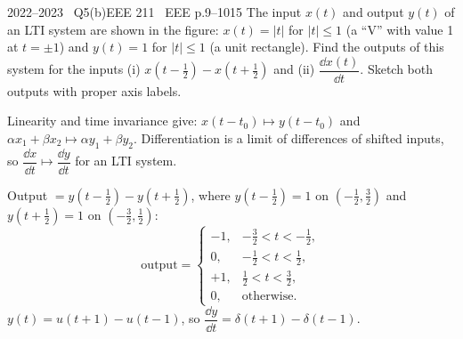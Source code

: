 \begin{qcard}{2022--2023 \textbullet\ Q5(b)}{EEE 211 \textbullet\ EEE p.9--10}{15}
The input $x(t)$ and output $y(t)$ of an LTI system are shown in the figure: $x(t)=|t|$ for $|t|\le1$ (a ``V'' with value 1 at $t=\pm1$) and $y(t)=1$ for $|t|\le1$ (a unit rectangle). Find the outputs of this system for the inputs (i) $x(t-\tfrac12)-x(t+\tfrac12)$ and (ii) $\dfrac{\dd x(t)}{\dd t}$. Sketch both outputs with proper axis labels.
\end{qcard}
\begin{solution}
Linearity and time invariance give: $x(t-t_0)\mapsto y(t-t_0)$ and $\alpha x_1+\beta x_2\mapsto\alpha y_1+\beta y_2$. Differentiation is a limit of differences of shifted inputs, so $\dfrac{\dd x}{\dd t}\mapsto\dfrac{\dd y}{\dd t}$ for an LTI system.

 Output $=y(t-\tfrac12)-y(t+\tfrac12)$, where $y(t-\frac12)=1$ on $(-\frac12,\frac32)$ and $y(t+\frac12)=1$ on $(-\frac32,\frac12)$:
\[
\text{output}=\begin{cases}-1,&-\frac32<t<-\frac12,\\0,&-\frac12<t<\frac12,\\+1,&\frac12<t<\frac32,\\0,&\text{otherwise.}\end{cases}
\]
 $y(t)=u(t+1)-u(t-1)$, so $\dfrac{\dd y}{\dd t}=\delta(t+1)-\delta(t-1)$.
\begin{center}
\hspace{4mm}
\end{center}
\end{solution}

